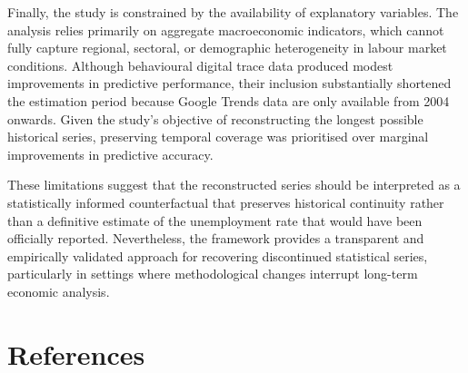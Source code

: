 \documentclass[
  letterpaper,
  DIV=11,
  numbers=noendperiod]{scrartcl}
\begin{document}
Finally, the study is constrained by the availability of explanatory
variables. The analysis relies primarily on aggregate macroeconomic
indicators, which cannot fully capture regional, sectoral, or
demographic heterogeneity in labour market conditions. Although
behavioural digital trace data produced modest improvements in
predictive performance, their inclusion substantially shortened the
estimation period because Google Trends data are only available from
2004 onwards. Given the study's objective of reconstructing the longest
possible historical series, preserving temporal coverage was prioritised
over marginal improvements in predictive accuracy.

These limitations suggest that the reconstructed series should be
interpreted as a statistically informed counterfactual that preserves
historical continuity rather than a definitive estimate of the
unemployment rate that would have been officially reported.
Nevertheless, the framework provides a transparent and empirically
validated approach for recovering discontinued statistical series,
particularly in settings where methodological changes interrupt
long-term economic analysis.

\clearpage

\section{References}\label{references}
\end{document}
